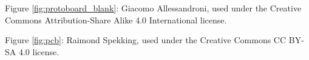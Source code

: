 Figure \ref{fig:protoboard_blank}: Giacomo Allessandroni, used under the
Creative Commons Attribution-Share Alike 4.0 International license.

Figure \ref{fig:pcb}: Raimond Spekking, used under the Creative Commons
CC BY-SA 4.0 license.
